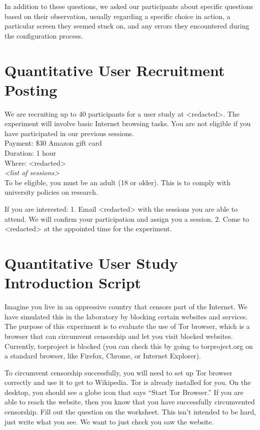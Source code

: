\documentclass[USenglish,oneside,twocolumn]{article}
\begin{document}
In addition to these questions, we asked our participants about specific questions based on their observation, usually regarding a specific choice in action, a particular screen they seemed stuck on, and any errors they encountered during the configuration process. 

\section{Quantitative User Recruitment Posting}
\label{quantitative-recruitment}
We are recruiting up to 40 participants for a user study at <redacted>. %
The experiment will involve basic Internet browsing tasks. You are not eligible if you have participated in our previous sessions.\\

\indent Payment: \$30 Amazon gift card\\
\indent Duration: 1 hour \\
\indent Where: <redacted> \\ %

\textit{<list of sessions>}\\

To be eligible, you must be an adult (18 or older). This is to comply with university policies on research. 

If you are interested: 1. Email <redacted> %
with the sessions you are able to attend. We will confirm your participation and assign you a session. 
2. Come to <redacted> %
at the appointed time for the experiment.

\section{Quantitative User Study Introduction Script} 
\label{quantitative-script} 
Imagine you live in an oppressive country that censors part of the Internet. We have simulated this in the laboratory by blocking certain websites and services.  The purpose of this experiment is to evaluate the use of Tor browser, which is a browser that can circumvent censorship and let you visit blocked websites. Currently, torproject is blocked (you can check this by going to torproject.org on a standard browser, like Firefox, Chrome, or Internet Explorer). 

To circumvent censorship successfully, you will need to set up Tor browser correctly and use it to get to Wikipedia. Tor is already installed for you. On the desktop, you should see a globe icon that says ``Start Tor Browser.'' If you are able to reach the website, then you know that you have successfully circumvented censorship. Fill out the question on the worksheet. This isn't intended to be hard, just write what you see. We want to just check you saw the website. 
\end{document}
